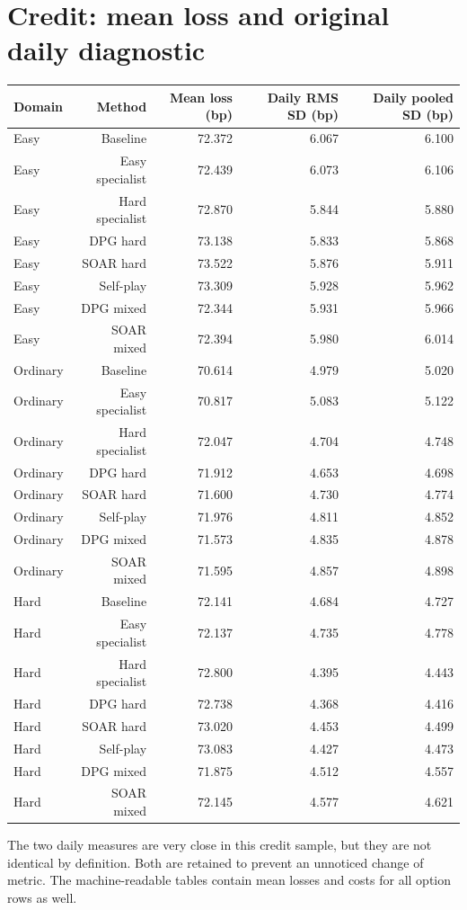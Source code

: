 \documentclass[11pt,a4paper]{article}
\begin{document}
\section{Credit: mean loss and original daily diagnostic}
\begin{footnotesize}
\begin{tabular}{lrrrr}
\toprule
Domain & Method & Mean loss (bp) & Daily RMS SD (bp) & Daily pooled SD (bp) \\
\midrule
Easy & Baseline & 72.372 & 6.067 & 6.100 \\
Easy & Easy specialist & 72.439 & 6.073 & 6.106 \\
Easy & Hard specialist & 72.870 & 5.844 & 5.880 \\
Easy & DPG hard & 73.138 & 5.833 & 5.868 \\
Easy & SOAR hard & 73.522 & 5.876 & 5.911 \\
Easy & Self-play & 73.309 & 5.928 & 5.962 \\
Easy & DPG mixed & 72.344 & 5.931 & 5.966 \\
Easy & SOAR mixed & 72.394 & 5.980 & 6.014 \\
Ordinary & Baseline & 70.614 & 4.979 & 5.020 \\
Ordinary & Easy specialist & 70.817 & 5.083 & 5.122 \\
Ordinary & Hard specialist & 72.047 & 4.704 & 4.748 \\
Ordinary & DPG hard & 71.912 & 4.653 & 4.698 \\
Ordinary & SOAR hard & 71.600 & 4.730 & 4.774 \\
Ordinary & Self-play & 71.976 & 4.811 & 4.852 \\
Ordinary & DPG mixed & 71.573 & 4.835 & 4.878 \\
Ordinary & SOAR mixed & 71.595 & 4.857 & 4.898 \\
Hard & Baseline & 72.141 & 4.684 & 4.727 \\
Hard & Easy specialist & 72.137 & 4.735 & 4.778 \\
Hard & Hard specialist & 72.800 & 4.395 & 4.443 \\
Hard & DPG hard & 72.738 & 4.368 & 4.416 \\
Hard & SOAR hard & 73.020 & 4.453 & 4.499 \\
Hard & Self-play & 73.083 & 4.427 & 4.473 \\
Hard & DPG mixed & 71.875 & 4.512 & 4.557 \\
Hard & SOAR mixed & 72.145 & 4.577 & 4.621 \\
\bottomrule
\end{tabular}
\end{footnotesize}\par\medskip
The two daily measures are very close in this credit sample, but they are not identical by definition. Both are retained to prevent an unnoticed change of metric. The machine-readable tables contain mean losses and costs for all option rows as well.
\clearpage
\end{document}
